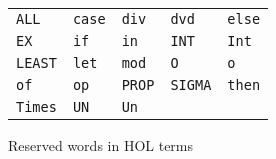 \begin{figure}[htbp]
\begin{center}
\begin{tabular}{|lllll|}
\hline
\texttt{ALL} &
\texttt{case} &
\texttt{div} &
\texttt{dvd} &
\texttt{else} \\
\texttt{EX} &
\texttt{if} &
\texttt{in} &
\texttt{INT} &
\texttt{Int} \\
\texttt{LEAST} &
\texttt{let} &
\texttt{mod} &
\texttt{O} &
\texttt{o} \\
\texttt{of} &
\texttt{op} &
\texttt{PROP} &
\texttt{SIGMA} &
\texttt{then} \\
\texttt{Times} &
\texttt{UN} &
\texttt{Un} &&\\
\hline
\end{tabular}
\end{center}
\caption{Reserved words in HOL terms}
\label{fig:ReservedWords}
\end{figure}


